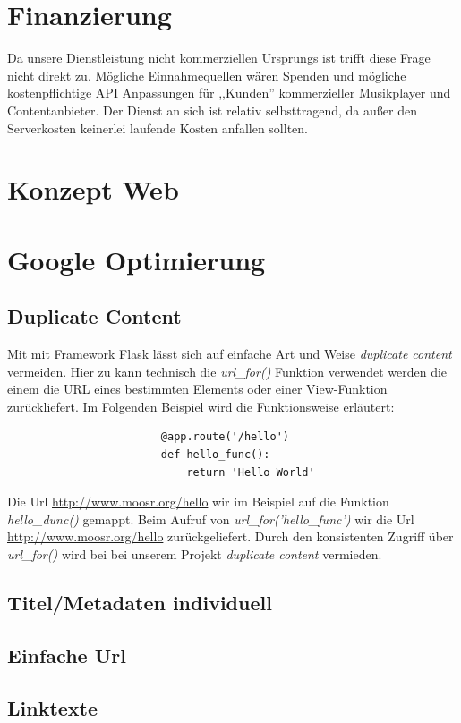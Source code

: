 \documentclass[11pt]{scrreprt}
\begin{document}
\chapter{Finanzierung}
Da unsere Dienstleistung nicht kommerziellen Ursprungs ist trifft diese Frage
nicht direkt zu. Mögliche Einnahmequellen wären Spenden und mögliche kostenpflichtige API
Anpassungen für ,,Kunden'' kommerzieller Musikplayer und Contentanbieter.
Der Dienst an sich ist relativ selbsttragend, da außer den Serverkosten
keinerlei laufende Kosten anfallen sollten.

\chapter{Konzept Web}

\chapter{Google Optimierung}
\section{Duplicate Content}
Mit mit Framework Flask lässt sich auf einfache Art und Weise \emph{duplicate
content} vermeiden. Hier zu kann technisch die \emph{url\_for()} Funktion
verwendet werden die einem die URL eines bestimmten Elements oder einer
View-Funktion zurückliefert. Im Folgenden Beispiel wird die Funktionsweise
erläutert:
\begin{verbatim}
                        @app.route('/hello')
                        def hello_func():
                            return 'Hello World'
\end{verbatim}

Die Url \url{http://www.moosr.org/hello} wir im Beispiel auf die Funktion
\emph{hello\_dunc()} gemappt. Beim Aufruf von \emph{url\_for('hello\_func')} wir
die Url \url{http://www.moosr.org/hello} zurückgeliefert. Durch den konsistenten
Zugriff über \emph{url\_for()} wird bei bei unserem Projekt
\emph{duplicate content} vermieden.


\section{Titel/Metadaten individuell}
\section{Einfache Url}
\section{Linktexte}
\end{document}
